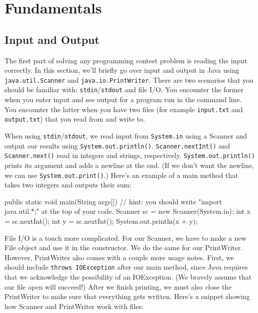 \chapter{Fundamentals}

\section{Input and Output}

The first part of solving any programming contest problem is reading the input correctly. In this section, we'll briefly go over input and output in Java using \texttt{java.util.Scanner} and \texttt{java.io.PrintWriter}. There are two scenarios that you should be familiar with: \texttt{stdin}/\texttt{stdout} and file I/O. You encounter the former when you enter input and see output for a program run in the command line. You encounter the latter when you have two files (for example \texttt{input.txt} and \texttt{output.txt}) that you read from and write to.

When using \texttt{stdin}/\texttt{stdout}, we read input from \texttt{System.in} using a Scanner and output our results using \texttt{System.out.println()}. \texttt{Scanner.nextInt()} and \texttt{Scanner.next()} read in integers and strings, respectively. \texttt{System.out.println()} prints its argument and adds a newline at the end. (If we don't want the newline, we can use \texttt{System.out.print()}.) Here's an example of a main method that takes two integers and outputs their sum:

\begin{mylstlisting}
public static void main(String args[]){
  // hint: you should write "import java.util.*;" at the top of your code.
  Scanner sc = new Scanner(System.in);
  int x = sc.nextInt();
  int y = sc.nextInt();
  System.out.println(x + y);
}
\end{mylstlisting}

File I/O is a touch more complicated. For our Scanner, we have to make a new File object and use it in the constructor. We do the same for our PrintWriter. However, PrintWriter also comes with a couple more usage notes. First, we should include \texttt{throws IOException} after our main method, since Java requires that we acknowledge the possibility of an IOException. (We bravely assume that our file open will succeed!) After we finish printing, we must also close the PrintWriter to make sure that everything gets written. Here's a snippet showing how Scanner and PrintWriter work with files: 

